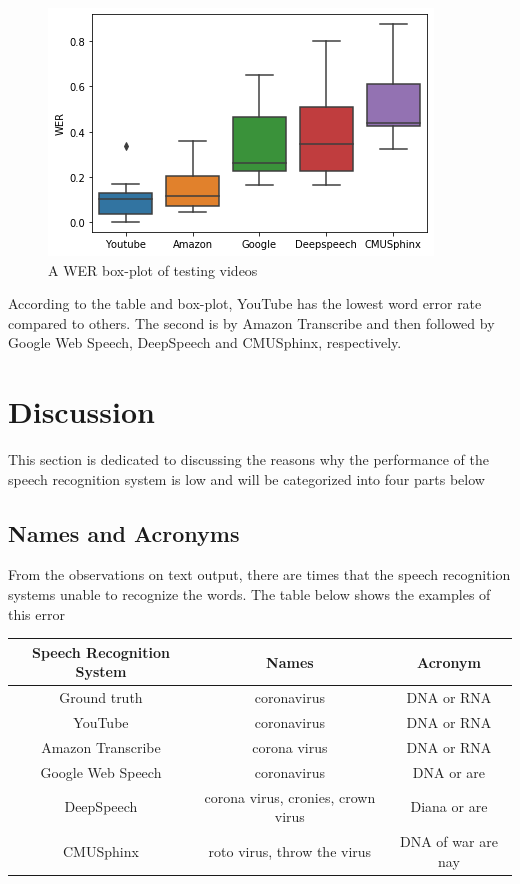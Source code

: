 \documentclass[natbib]{muthesis}
\begin{document}
 \begin{figure}[H]
 	\centering
 	\captionsetup{justification=centering}
 	\includegraphics[width=0.7\linewidth]{images/boxplot}
 	\caption{A WER box-plot of testing videos}
 	\label{fig:wer-boxplot}
 \end{figure}

 
 According to the table and box-plot, YouTube has the lowest word error rate compared to others. The second is by Amazon Transcribe and then followed by Google Web Speech, DeepSpeech and CMUSphinx, respectively. 
 \section{Discussion}
 
 This section is dedicated to discussing the reasons why the performance of the speech recognition system is low and will be categorized into four parts below
 \subsection{Names and Acronyms}

 From the observations on text output, there are times that the speech recognition systems unable to recognize the words. The table below shows the examples of this error 
 \begin{center}
 	\begin{tabular}{ |c|c|c| } 
 		\hline
 		Speech Recognition System & Names & Acronym  \\ 
 		\hline
 		Ground truth & coronavirus & DNA or RNA\\
 		YouTube & coronavirus & DNA or RNA\\ 
 		Amazon Transcribe & corona virus & DNA or RNA\\
 		Google Web Speech & coronavirus & DNA or are\\
 		DeepSpeech & corona virus, cronies, crown virus &Diana or are\\
 		CMUSphinx & roto virus, throw the virus	& DNA of war are nay\\
 		\hline
 	\end{tabular}
 \end{center}
 
\end{document}
